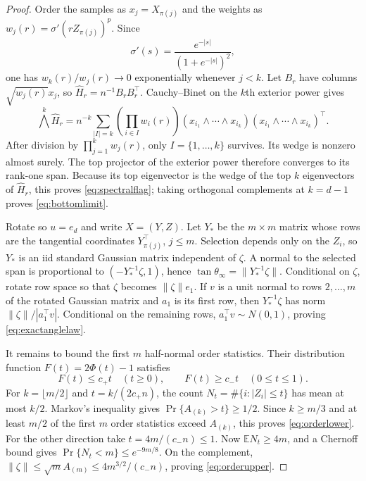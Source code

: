 \documentclass[11pt]{article}
\newcommand{\E}{\mathbb E}
\begin{document}
\begin{proof}
Order the samples as $x_j=X_{\pi(j)}$ and the weights as $w_j(r)=\sigma'(rZ_{\pi(j)})^p$.  Since
\[
 \sigma'(s)=\frac{e^{-|s|}}{(1+e^{-|s|})^2},
\]
one has $w_k(r)/w_j(r)\to0$ exponentially whenever $j<k$.  Let $B_r$ have columns
$\sqrt{w_j(r)}x_j$, so $\widehat H_r=n^{-1}B_rB_r^\top$.  Cauchy--Binet on the $k$th exterior power gives
\[
 \bigwedge^k\widehat H_r
 =n^{-k}\!\sum_{|I|=k}\left(\prod_{i\in I}w_i(r)\right)
 (x_{i_1}\wedge\cdots\wedge x_{i_k})(x_{i_1}\wedge\cdots\wedge x_{i_k})^\top.
\]
After division by $\prod_{j=1}^kw_j(r)$, only $I=\{1,\ldots,k\}$ survives.  Its wedge is nonzero almost surely.
The top projector of the exterior power therefore converges to its rank-one span.  Because its top eigenvector is
the wedge of the top $k$ eigenvectors of $\widehat H_r$, this proves \eqref{eq:spectralflag}; taking orthogonal
complements at $k=d-1$ proves \eqref{eq:bottomlimit}.

Rotate so $u=e_d$ and write $X=(Y,Z)$.  Let $Y_*$ be the $m\times m$ matrix whose rows are the tangential
coordinates $Y_{\pi(j)}^\top$, $j\le m$.  Selection depends only on the $Z_i$, so $Y_*$ is an iid standard
Gaussian matrix independent of $\zeta$.  A normal to the selected span is proportional to
$(-Y_*^{-1}\zeta,1)$, hence $\tan\theta_\infty=\lVert Y_*^{-1}\zeta\rVert$.  Conditional on $\zeta$, rotate
row space so that $\zeta$ becomes $\lVert\zeta\rVert e_1$.  If $v$ is a unit normal to rows $2,\ldots,m$ of the
rotated Gaussian matrix and $a_1$ is its first row, then
$Y_*^{-1}\zeta$ has norm $\lVert\zeta\rVert/|a_1^\top v|$.  Conditional on the remaining rows,
$a_1^\top v\sim N(0,1)$, proving \eqref{eq:exactanglelaw}.

It remains to bound the first $m$ half-normal order statistics.  Their distribution function
$F(t)=2\Phi(t)-1$ satisfies
\begin{equation}
 F(t)\le c_+t\quad(t\ge0),
 \qquad
 F(t)\ge c_-t\quad(0\le t\le1).
 \label{eq:halfnormalbounds}
\end{equation}
For $k=\lfloor m/2\rfloor$ and $t=k/(2c_+n)$, the count
$N_t=\#\{i:|Z_i|\le t\}$ has mean at most $k/2$.  Markov's inequality gives
$\Pr\{A_{(k)}>t\}\ge1/2$.  Since $k\ge m/3$ and at least $m/2$ of the first $m$ order statistics exceed
$A_{(k)}$, this proves \eqref{eq:orderlower}.  For the other direction take $t=4m/(c_-n)\le1$.
Now $\E N_t\ge4m$, and a Chernoff bound gives
$\Pr\{N_t<m\}\le e^{-9m/8}$.  On the complement,
$\lVert\zeta\rVert\le\sqrt mA_{(m)}\le4m^{3/2}/(c_-n)$, proving \eqref{eq:orderupper}.


\end{proof}
\end{document}

